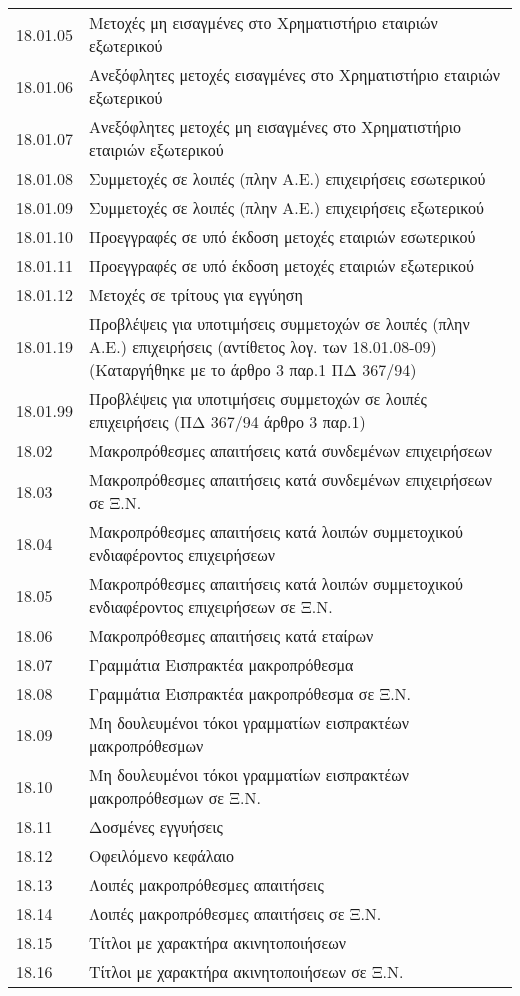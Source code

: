 \documentclass[A4,10pt,greek]{book}
\begin{document}
\begin{tabularx}{\linewidth}{lX}
18.01.05 & Μετοχές μη εισαγμένες στο Χρηματιστήριο εταιριών εξωτερικού\\
18.01.06 & Ανεξόφλητες μετοχές εισαγμένες στο Χρηματιστήριο εταιριών εξωτερικού\\
18.01.07 & Ανεξόφλητες μετοχές μη εισαγμένες στο Χρηματιστήριο εταιριών εξωτερικού\\
18.01.08 & Συμμετοχές σε λοιπές (πλην Α.Ε.) επιχειρήσεις εσωτερικού\\
18.01.09 & Συμμετοχές σε λοιπές (πλην Α.Ε.) επιχειρήσεις εξωτερικού\\
18.01.10 & Προεγγραφές σε υπό έκδοση μετοχές εταιριών εσωτερικού\\
18.01.11 & Προεγγραφές σε υπό έκδοση μετοχές εταιριών εξωτερικού\\
18.01.12 & Μετοχές σε τρίτους για εγγύηση\\
18.01.19 & Προβλέψεις για υποτιμήσεις συμμετοχών σε λοιπές (πλην Α.Ε.) επιχειρήσεις (αντίθετος λογ. των 18.01.08-09) (Καταργήθηκε με το άρθρο 3 παρ.1 ΠΔ 367/94)\\
18.01.99 & Προβλέψεις για υποτιμήσεις συμμετοχών σε λοιπές επιχειρήσεις (ΠΔ 367/94 άρθρο 3 παρ.1)\\
18.02 & Μακροπρόθεσμες απαιτήσεις κατά συνδεμένων επιχειρήσεων\\
18.03 & Μακροπρόθεσμες απαιτήσεις κατά συνδεμένων επιχειρήσεων σε Ξ.Ν.\\
18.04 & Μακροπρόθεσμες απαιτήσεις κατά λοιπών συμμετοχικού ενδιαφέροντος επιχειρήσεων\\
18.05 & Μακροπρόθεσμες απαιτήσεις κατά λοιπών συμμετοχικού ενδιαφέροντος επιχειρήσεων σε Ξ.Ν.\\
18.06 & Μακροπρόθεσμες απαιτήσεις κατά εταίρων\\
18.07 & Γραμμάτια Εισπρακτέα μακροπρόθεσμα\\
18.08 & Γραμμάτια Εισπρακτέα μακροπρόθεσμα σε Ξ.Ν.\\
18.09 & Μη δουλευμένοι τόκοι γραμματίων εισπρακτέων μακροπρόθεσμων\\
18.10 & Μη δουλευμένοι τόκοι γραμματίων εισπρακτέων μακροπρόθεσμων σε Ξ.Ν.\\
18.11 & Δοσμένες εγγυήσεις\\
18.12 & Οφειλόμενο κεφάλαιο\\
18.13 & Λοιπές μακροπρόθεσμες απαιτήσεις\\
18.14 & Λοιπές μακροπρόθεσμες απαιτήσεις σε Ξ.Ν.\\
18.15 & Τίτλοι με χαρακτήρα ακινητοποιήσεων\\
18.16 & Τίτλοι με χαρακτήρα ακινητοποιήσεων σε Ξ.Ν.\\

\end{tabularx}
\end{document}
